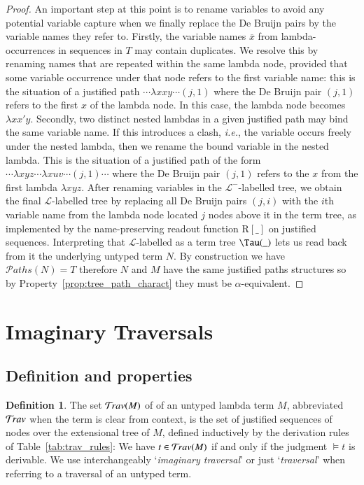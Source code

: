 \documentclass{elsarticle}
\makeatletter
\theoremstyle{plain}
\theoremstyle{definition}
\newtheorem{definition}{Definition}[section]
\newcommand{\travulc}{\travset}
\def\readout{\mathrm{R}} %
\newcommand{\ctree}{\Tau} %
\newcommand\pathset{{\mathcal{P}aths}} %
\renewcommand\ie{{\it i.e.\@\xspace}}
\def\istraversal{\models}
\makeatother
\begin{document}
\begin{proof}
An important step at this point is to rename variables to avoid any potential variable capture when we finally replace the De Bruijn pairs by the variable names they refer to.
%
Firstly, the variable names $\overline{x}$ from lambda-occurrences in sequences in $T$ may contain duplicates. We resolve this by renaming names that are repeated within the same lambda node, provided that some variable occurrence under that node refers to the first variable name: this is the situation of a justified path  $\cdots \lambda x x y \cdots (j,1)$ where the De Bruijn pair $(j,1)$ refers to the first $x$ of the lambda node. In this case, the lambda node becomes $\lambda x x' y$.
%
Secondly, two distinct nested lambdas in a given justified path may bind the same variable name. If this introduces a clash, \ie, the variable occurs freely under the nested lambda, then we rename the bound variable in the nested lambda. This is the situation of a justified path of the form $\cdots \lambda{xyz} \cdots \lambda {xuv} \cdots (j,1) \cdots$
 where the De Bruijn pair $(j,1)$ refers to the $x$ from the first lambda $\lambda{x y z}$.
After renaming variables in the $\mathcal{L^-}$-labelled tree, we obtain the final $\mathcal{L}$-labelled tree by replacing all De Bruijn pairs $(j,i)$ with the $i$th variable name from the lambda node located $j$ nodes above it in the term tree, as implemented by the name-preserving readout function $\readout[\_]$ on justified sequences.
%
Interpreting that $\mathcal{L}$-labelled as a term tree $\ctree(\_ )$ lets us read back from it the underlying untyped term $N$.
%
By construction we have $\pathset(N) = T$ therefore
$N$ and $M$ have the same justified paths structures so by
Property~\ref{prop:tree_path_charact} they must be $\alpha$-equivalent.
\end{proof}


\section{Imaginary Traversals}
\label{sec:imaginary_traversals}
\subsection{Definition and properties}

\begin{definition}
The set $\travulc(M)$ of  of an untyped lambda term $M$, abbreviated $\travulc$ when the term is clear from context, is the set of justified sequences of nodes over the extensional tree of $M$, defined inductively by the derivation rules of Table~\ref{tab:trav_rules}: We have
 $t \in \travulc(M)$ if and only if the judgment $\istraversal t$
 is derivable.
%
 We use interchangeably `\emph{imaginary traversal}' or just `\emph{traversal}' when referring to a traversal of an untyped term.
\end{definition}
\end{document}
